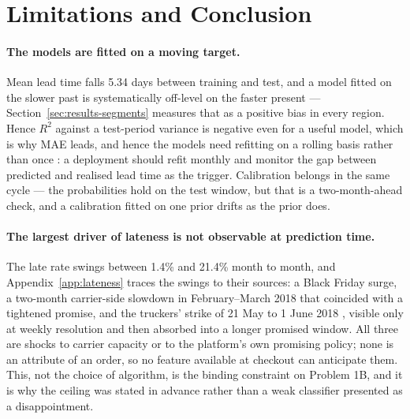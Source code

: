 \section{Limitations and Conclusion}
\label{sec:limitations}

\paragraph{The models are fitted on a moving target.}
Mean lead time falls 5.34 days between training and test, and a model fitted on
the slower past is systematically off-level on the faster present ---
Section~\ref{sec:results-segments} measures that as a positive bias in every
region. Hence $R^2$ against a test-period variance is negative even for a useful
model, which is why MAE leads, and hence the models need refitting on a rolling
basis rather than once \citep{gama2014drift}: a deployment should refit monthly
and monitor the gap between predicted and realised lead time as the trigger.
Calibration belongs in the same cycle --- the probabilities hold on the test
window, but that is a two-month-ahead check, and a calibration fitted on one
prior drifts as the prior does.

\paragraph{The largest driver of lateness is not observable at prediction time.}
The late rate swings between 1.4\% and 21.4\% month to month, and
Appendix~\ref{app:lateness} traces the swings to their sources: a Black Friday
surge, a two-month carrier-side slowdown in February--March 2018 that coincided
with a tightened promise, and the truckers' strike of 21 May to 1 June 2018
\citep{bloomberg2018strike}, visible only at weekly resolution and then absorbed
into a longer promised window. All three are shocks to carrier capacity or to
the platform's own promising policy; none is an attribute of an order, so no
feature available at checkout can anticipate them. This, not the choice of
algorithm, is the binding constraint on Problem 1B, and it is why the ceiling
was stated in advance rather than a weak classifier presented as a
disappointment.

